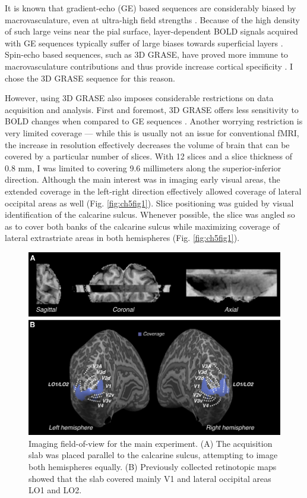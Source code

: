 It is known that gradient-echo (GE) based sequences are considerably biased by macrovasculature, even at ultra-high field strengths \cite{DeMartino:2013qy}. Because of the high density of such large veins near the pial surface, layer-dependent BOLD signals acquired with GE sequences typically suffer of large biases towards superficial layers \cite{Polimeni:2010fl,Koopmans:2010hq}. Spin-echo based sequences, such as 3D GRASE, have proved more immune to macrovasculature contributions and thus provide increase cortical specificity \cite{DeMartino:2013qy}. I chose the 3D GRASE sequence for this reason.

However, using 3D GRASE also imposes considerable restrictions on data acquisition and analysis. First and foremost, 3D GRASE offers less sensitivity to BOLD changes when compared to GE sequences \cite{DeMartino:2013qy}. Another worrying restriction is very limited coverage --- while this is usually not an issue for conventional fMRI, the increase in resolution effectively decreases the volume of brain that can be covered by a particular number of slices. With 12 slices and a slice thickness of 0.8 mm, I was limited to covering 9.6 millimeters along the superior-inferior direction. Although the main interest was in imaging early visual areas, the extended coverage in the left-right direction effectively allowed coverage of lateral occipital areas as well (Fig. \ref{fig:ch5fig1}). Slice positioning was guided by visual identification of the calcarine sulcus. Whenever possible, the slice was angled so as to cover both banks of the calcarine sulcus while maximizing coverage of lateral extrastriate areas in both hemispheres (Fig. \ref{fig:ch5fig1}).

\begin{figure}
  \centering
  \includegraphics[keepaspectratio]{Fig2.pdf}
  \caption[Imaging field-of-view for the main experiment.]{Imaging field-of-view for the main experiment. (A) The acquisition slab was placed parallel to the calcarine sulcus, attempting to image both hemispheres equally. (B) Previously collected retinotopic maps showed that the slab covered mainly V1 and lateral occipital areas LO1 and LO2.}
  \label{fig:ch5fig2}
\end{figure}

